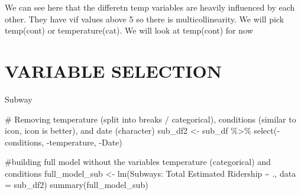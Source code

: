 \documentclass[
  letterpaper,
  DIV=11,
  numbers=noendperiod]{scrartcl}
\newenvironment{Shaded}{\begin{snugshade}}{\end{snugshade}}
\newcommand{\AttributeTok}[1]{\textcolor[rgb]{0.40,0.45,0.13}{#1}}
\newcommand{\CommentTok}[1]{\textcolor[rgb]{0.37,0.37,0.37}{#1}}
\newcommand{\FunctionTok}[1]{\textcolor[rgb]{0.28,0.35,0.67}{#1}}
\newcommand{\NormalTok}[1]{\textcolor[rgb]{0.00,0.23,0.31}{#1}}
\newcommand{\OtherTok}[1]{\textcolor[rgb]{0.00,0.23,0.31}{#1}}
\newcommand{\SpecialCharTok}[1]{\textcolor[rgb]{0.37,0.37,0.37}{#1}}
\newcommand{\StringTok}[1]{\textcolor[rgb]{0.13,0.47,0.30}{#1}}
\begin{document}
We can see here that the differetn temp variables are heavily influenced
by each other. They have vif values above 5 so there is
multicollinearity. We will pick temp(cont) or temperature(cat). We will
look at temp(cont) for now

\hypertarget{variable-selection}{%
\section{VARIABLE SELECTION}\label{variable-selection}}

Subway

\begin{Shaded}
\begin{Highlighting}[]
\CommentTok{\# Removing temperature (split into breaks / categorical), conditions (similar to icon, icon is better), and date (character)}
\NormalTok{sub\_df2 }\OtherTok{\textless{}{-}}  
\NormalTok{  sub\_df }\SpecialCharTok{\%\textgreater{}\%}
  \FunctionTok{select}\NormalTok{(}\SpecialCharTok{{-}}\NormalTok{conditions,}
         \SpecialCharTok{{-}}\NormalTok{temperature,}
         \SpecialCharTok{{-}}\NormalTok{Date)}

\CommentTok{\#building full model without the variables temperature (categorical) and conditions}
\NormalTok{full\_model\_sub }\OtherTok{\textless{}{-}} \FunctionTok{lm}\NormalTok{(}\StringTok{\textasciigrave{}}\AttributeTok{Subways: Total Estimated Ridership}\StringTok{\textasciigrave{}} \SpecialCharTok{\textasciitilde{}}\NormalTok{ ., }\AttributeTok{data =}\NormalTok{ sub\_df2)}
\FunctionTok{summary}\NormalTok{(full\_model\_sub)}
\end{Highlighting}
\end{Shaded}
\end{document}
